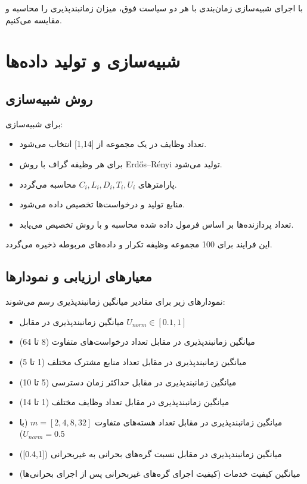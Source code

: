 \documentclass[12pt,a4paper]{report}
\begin{document}
با اجرای شبیه‌سازی زمان‌بندی با هر دو سیاست فوق، میزان زمانبندپذیری را محاسبه و مقایسه می‌کنیم.

\chapter{شبیه‌سازی و تولید داده‌ها}
\section{روش شبیه‌سازی}
برای شبیه‌سازی:
\begin{itemize}
\item تعداد وظایف در یک مجموعه از [1,14] انتخاب می‌شود.
\item برای هر وظیفه گراف با روش Erdős–Rényi تولید می‌شود.
\item پارامترهای $C_i, L_i, D_i, T_i, U_i$ محاسبه می‌گردد.
\item منابع تولید و درخواست‌ها تخصیص داده می‌شود.
\item تعداد پردازنده‌ها بر اساس فرمول داده شده محاسبه و با روش  تخصیص می‌یابد.
\end{itemize}

این فرایند برای 100 مجموعه وظیفه تکرار و داده‌های مربوطه ذخیره می‌گردد.

\section{معیارهای ارزیابی و نمودارها}
نمودارهای زیر برای مقادیر میانگین زمانبندپذیری رسم می‌شوند:
\begin{itemize}
\item میانگین زمانبندپذیری در مقابل $U_{norm} \in [0.1, 1]$
\item میانگین زمانبندپذیری در مقابل تعداد درخواست‌های متفاوت (8 تا 64)
\item میانگین زمانبندپذیری در مقابل تعداد منابع مشترک مختلف (1 تا 5)
\item میانگین زمانبندپذیری در مقابل حداکثر زمان دسترسی (5 تا 10)
\item میانگین زمانبندپذیری در مقابل تعداد وظایف مختلف (1 تا 14)
\item میانگین زمانبندپذیری در مقابل تعداد هسته‌های متفاوت $m = [2,4,8,32]$ (با $U_{norm}=0.5$)
\item میانگین زمانبندپذیری در مقابل نسبت گره‌های بحرانی به غیربحرانی ([0.4,1])
\item میانگین کیفیت خدمات (کیفیت اجرای گره‌های غیربحرانی پس از اجرای بحرانی‌ها)
\end{itemize}
\end{document}
